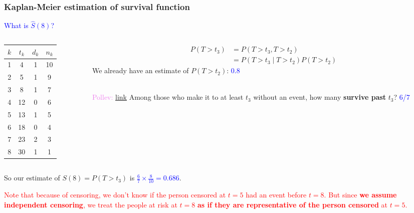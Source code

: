 \documentclass[10pt,t]{beamer}
\begin{document}
\begin{frame}
	\frametitle{Kaplan-Meier estimation of survival function}
	
	\vspace{-5 mm}
	
	\textcolor{blue}{What is $\widehat{S}(8)$?}
	
	\medskip
	
	\begin{columns}
		\begin{column}{0.3\textwidth}
			\begin{center}
				\begin{tabular}{|c|c|c|c|}
					\hline
					$k$ & $t_k$ & $d_k$ & $n_k$ \\
					\hline
					1 & 4 & 1 & 10 \\
					2& 5 & 1 & 9 \\
					3& 8 & 1 & 7 \\
					4&12 & 0 & 6 \\
					5&13 & 1 & 5 \\
					6&18 & 0 & 4 \\
					7&23 & 2 & 3 \\
					8&30 & 1 & 1 \\
					\hline
				\end{tabular}
			\end{center}
		\end{column}
		\begin{column}{0.7\textwidth}  %
			\begin{align*}
			P(T > t_3) &= P(T > t_3, T > t_2) \\
			&= P(T > t_3 \mid T > t_2)P(T > t_2)
			\end{align*}
			We already have an estimate of $P(T > t_2)$: \textcolor{blue}{0.8}  
			\\ ~\ 
			
			\textcolor{violet}{Pollev: \href{https://PollEv.com/free_text_polls/oxjKMRbHncKvL4aoSLfE3/respond}{link} }Among those who make it to at least $t_3$ without an event, how many \textbf{survive past} $t_3$? \pause   \textcolor{blue}{6/7} 
		\end{column}
	\end{columns}
	\vspace{0.5cm}
	So our estimate of $S(8) = P(T > t_3)$ is \textcolor{blue}{$\frac{6}{7} \times \frac{8}{10} = 0.686$}.
	
	\medskip
	
	 \textcolor{red}{Note that because of censoring, we don't know if the person censored at $t = 5$ had an event before $t = 8$. But since \textbf{we assume independent censoring}, we treat the people at risk at $t = 8$ \textbf{as if they are representative of the person censored} at $t = 5$.}   
\end{frame}
\end{document}
